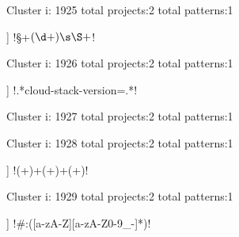 Cluster i: 1925
total projects:2
total patterns:1
\begin{multicols}{1}
\begin{description}[noitemsep,topsep=0pt]
\item [[2] ] \cverb!\S+\s\((\d+)\s\S+\)!
\end{description}
\end{multicols}







Cluster i: 1926
total projects:2
total patterns:1
\begin{multicols}{1}
\begin{description}[noitemsep,topsep=0pt]
\item [[2] ] \cverb!\n.*cloud-stack-version=.*!
\end{description}
\end{multicols}







Cluster i: 1927
total projects:2
total patterns:1
\begin{multicols}{1}
\end{multicols}







Cluster i: 1928
total projects:2
total patterns:1
\begin{multicols}{1}
\begin{description}[noitemsep,topsep=0pt]
\item [[2] ] \cverb!(\w+)\s+(\w+)\s+(\w+)!
\end{description}
\end{multicols}







Cluster i: 1929
total projects:2
total patterns:1
\begin{multicols}{1}
\begin{description}[noitemsep,topsep=0pt]
\item [[2] ] \cverb!#:([a-zA-Z][a-zA-Z0-9_-]*)!
\end{description}
\end{multicols}







